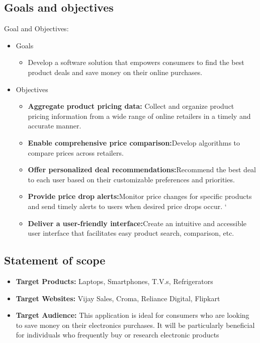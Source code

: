 \documentclass[a4paper,14pt,onecolumn]{report}
\begin{document}
	\subsection{Goals and objectives}  
	Goal and Objectives: 
	\begin{itemize}
		\item Goals
		\begin{itemize}
			\item Develop a software solution that empowers consumers to find the best
			product deals and save money on their online purchases.
		\end{itemize}
		\item Objectives
		\begin{itemize}
			\item \textbf{Aggregate product pricing data:} Collect and organize product pricing
			information from a wide range of online retailers in a timely and accurate
			manner.
			\item \textbf{Enable comprehensive price comparison:}Develop algorithms to compare
			prices across retailers.
			\item \textbf{Offer personalized deal recommendations:}Recommend the best deal to
			each user based on their customizable preferences and priorities.
			\item \textbf{Provide price drop alerts:}Monitor price changes for specific products and
			send timely alerts to users when desired price drops occur.
			`           \item \textbf{Deliver a user-friendly interface:}Create an intuitive and accessible user
			interface that facilitates easy product search, comparison, etc.
		\end{itemize}
	\end{itemize}
	
	\subsection{Statement of scope} 
	\begin{itemize}  
		\item	\textbf{Target Products:} Laptops, Smartphones, T.V.s, Refrigerators
		\item \textbf{Target Websites:} Vijay Sales, Croma, Reliance Digital, Flipkart
		\item \textbf{Target Audience:}  This application is ideal for consumers who are looking to
		save money on their electronics purchases. It will be particularly beneficial
		for individuals who frequently buy or research electronic products
	\end{itemize}
	
\end{document}

